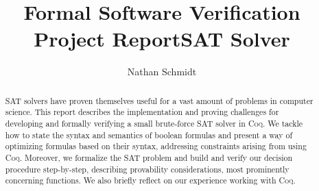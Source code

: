 \documentclass[runningheads]{llncs}
\begin{document}
\renewcommand{\lstlistingname}{List.}
\renewcommand{\thelstlisting}{\arabic{lstlisting}}
%
\title{Formal Software Verification Project Report\newline{}SAT Solver}
%
%
\author{Nathan Schmidt}
%
%
%
\maketitle              %
%
\begin{abstract}
SAT solvers have proven themselves useful for a vast amount of problems in computer science. This report describes the implementation and proving challenges for developing and formally verifying a small brute-force SAT solver in \textsc{Coq}. We tackle how to state the syntax and semantics of boolean formulas and present a way of optimizing formulas based on their syntax, addressing constraints arising from using \textsc{Coq}. Moreover, we formalize the SAT problem and build and verify our decision procedure step-by-step, describing provability considerations, most prominently concerning functions. We also briefly reflect on our experience working with \textsc{Coq}.

\end{abstract}
%
%
%





\printbibliography{}
\end{document}
